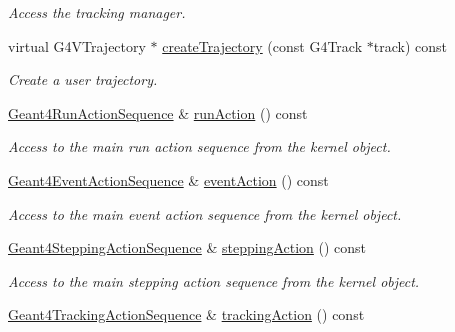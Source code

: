 \begin{DoxyCompactItemize}
\begin{DoxyCompactList}\small\item\em Access the tracking manager. \item\end{DoxyCompactList}\item 
virtual G4VTrajectory $\ast$ \hyperlink{class_d_d4hep_1_1_simulation_1_1_geant4_context_a1fba0133b5ff85fe0b1356b8d5b14b9a}{createTrajectory} (const G4Track $\ast$track) const 
\begin{DoxyCompactList}\small\item\em Create a user trajectory. \item\end{DoxyCompactList}\item 
\hyperlink{class_d_d4hep_1_1_simulation_1_1_geant4_run_action_sequence}{Geant4RunActionSequence} \& \hyperlink{class_d_d4hep_1_1_simulation_1_1_geant4_context_a1cf651992e7aca8cf16b8ca889690b60}{runAction} () const 
\begin{DoxyCompactList}\small\item\em Access to the main run action sequence from the kernel object. \item\end{DoxyCompactList}\item 
\hyperlink{class_d_d4hep_1_1_simulation_1_1_geant4_event_action_sequence}{Geant4EventActionSequence} \& \hyperlink{class_d_d4hep_1_1_simulation_1_1_geant4_context_a9e24c99880047718c2c9440567b214aa}{eventAction} () const 
\begin{DoxyCompactList}\small\item\em Access to the main event action sequence from the kernel object. \item\end{DoxyCompactList}\item 
\hyperlink{class_d_d4hep_1_1_simulation_1_1_geant4_stepping_action_sequence}{Geant4SteppingActionSequence} \& \hyperlink{class_d_d4hep_1_1_simulation_1_1_geant4_context_af1f076268388a8bb73914eec7f166809}{steppingAction} () const 
\begin{DoxyCompactList}\small\item\em Access to the main stepping action sequence from the kernel object. \item\end{DoxyCompactList}\item 
\hyperlink{class_d_d4hep_1_1_simulation_1_1_geant4_tracking_action_sequence}{Geant4TrackingActionSequence} \& \hyperlink{class_d_d4hep_1_1_simulation_1_1_geant4_context_a7138521b243570946a8b0cecd60d1b81}{trackingAction} () const 

\end{DoxyCompactItemize}
